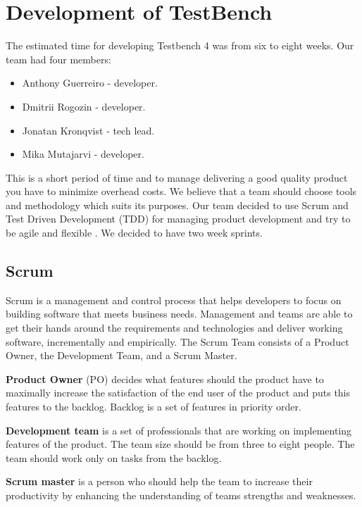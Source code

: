 \chapter{Development of TestBench}
\label{ch:testbenchdevelop}
  
  The estimated time for developing Testbench 4 was from six to eight weeks.
  Our team had four members:
  \begin{itemize}
    \item Anthony Guerreiro - developer.
    \item Dmitrii Rogozin - developer.
    \item Jonatan Kronqvist - tech lead.
    \item Mika Mutajarvi - developer.
    
  \end{itemize}
  
   This is a short period of time and to manage delivering a good quality
   product you have to minimize overhead costs. We believe that a team should choose tools
    and methodology which suits its purposes. 
    Our team decided to use Scrum and Test Driven Development (TDD) for managing
    product development and try to be agile and flexible \cite{scrumSite}. 
    We decided to have two week sprints.

  \section{Scrum}
    Scrum is a management and control process that helps developers to focus on building software 
    that meets business needs. Management and teams are able to get their
    hands around the requirements and technologies and deliver working software,
    incrementally and empirically. The Scrum Team consists of a Product Owner,
    the Development Team, and a Scrum Master.
    
  \textbf{Product Owner} (PO) decides what features should the product have to
  maximally increase the satisfaction of the end user of the product and puts this features to the backlog.
  Backlog is a set of features in priority order.
  
  \textbf{Development team} is
  a set of professionals that are working on implementing features of the product. 
  The team size should be from three to eight people. The team should work only on tasks from the backlog.
  
  \textbf{Scrum master} is a person who should help the team to increase their
  productivity by enhancing the understanding of teams strengths and weaknesses.

